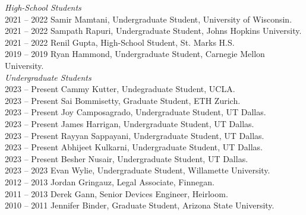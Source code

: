 
\textit{High-School Students} \\
2021 -- 2022 \hspace{28pt} Samir Mamtani, Undergraduate Student, University of Wisconsin. \\
2021 -- 2022 \hspace{28pt} Sampath Rapuri, Undergraduate Student, Johns Hopkins University. \\
2021 -- 2022 \hspace{28pt} Renil Gupta, High-School Student, St. Marks H.S. \\
2019 -- 2019 \hspace{28pt} Ryan Hammond, Undergraduate Student, Carnegie Mellon University. \\

\textit{Undergraduate Students} \\
2023 -- Present \hspace{14pt} Cammy Kutter, Undegraduate Student, UCLA. \\
2023 -- Present \hspace{14pt} Sai Bommisetty, Graduate Student, ETH Zurich. \\
2023 -- Present \hspace{14pt} Joy Camposagrado, Undergraduate Student, UT Dallas. \\
2023 -- Present \hspace{14pt} James Harrigan, Undergraduate Student, UT Dallas. \\
2023 -- Present \hspace{14pt} Rayyan Sappayani, Undergraduate Student, UT Dallas. \\
2023 -- Present \hspace{14pt} Abhijeet Kulkarni, Undergraduate Student, UT Dallas. \\
2023 -- Present \hspace{14pt} Besher Nusair, Undergraduate Student, UT Dallas. \\
2023 -- 2023 \hspace{28pt} Evan Wylie, Undergraduate Student, Willamette University. \\
2012 -- 2013 \hspace{28pt} Jordan Gringauz, Legal Associate, Finnegan. \\
2011 -- 2013 \hspace{28pt} Derek Gann, Senior Devices Engineer, Heirloom. \\
2010 -- 2011 \hspace{28pt} Jennifer Binder, Graduate Student, Arizona State University. \\

